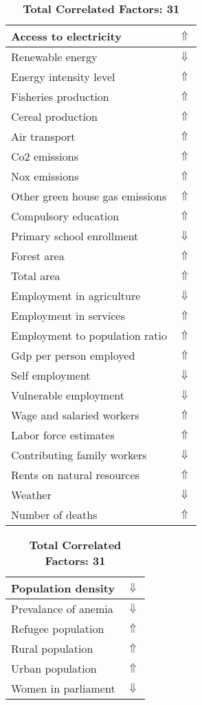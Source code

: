 \documentclass[12pt,notitlepage,oneside]{report}
\begin{document}
\begin{table}[!htb]
\caption{\textbf{Puts At High Risk: Farmers $\Uparrow$}}
\centering
\label{Correlated Socio-economic Factors0}
\begin{tabular}{|l|l|}
\hline
Access to electricity & $\Uparrow$\\ \hline
Renewable energy & $\Downarrow$\\ \hline
Energy intensity level & $\Uparrow$\\ \hline
Fisheries production & $\Uparrow$\\ \hline
Cereal production & $\Uparrow$\\ \hline
Air transport  & $\Uparrow$\\ \hline
Co2 emissions & $\Uparrow$\\ \hline
Nox emissions & $\Uparrow$\\ \hline
Other green house gas emissions & $\Uparrow$\\ \hline
Compulsory education & $\Uparrow$\\ \hline
Primary school enrollment & $\Downarrow$\\ \hline
Forest area & $\Uparrow$\\ \hline
Total area & $\Uparrow$\\ \hline
Employment in agriculture & $\Downarrow$\\ \hline
Employment in services & $\Uparrow$\\ \hline
Employment to population ratio & $\Uparrow$\\ \hline
Gdp per person employed & $\Uparrow$\\ \hline
Self employment & $\Downarrow$\\ \hline
Vulnerable employment & $\Downarrow$\\ \hline
Wage and salaried workers & $\Uparrow$\\ \hline
Labor force estimates & $\Uparrow$\\ \hline
Contributing family workers & $\Downarrow$\\ \hline
Rents on natural resources & $\Uparrow$\\ \hline
Weather & $\Downarrow$\\ \hline
Number of deaths & $\Uparrow$\\ \hline
\end{tabular}
\begin{tabular}{|l|l|}
\hline
Population density & $\Downarrow$\\ \hline
Prevalance of anemia & $\Downarrow$\\ \hline
Refugee population & $\Uparrow$\\ \hline
Rural population & $\Uparrow$\\ \hline
Urban population & $\Uparrow$\\ \hline
Women in parliament & $\Downarrow$\\ \hline
\end{tabular}
\caption*{\textbf{Total Correlated Factors: 31}}
\end{table}
\end{document}
